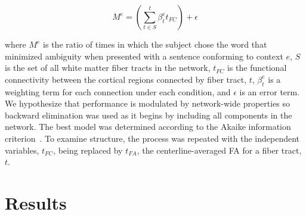 \begin{equation}
M^{e} = \left( \sum^{t}_{t \in S} \beta_{t}^{e} t_{FC} \right) + \epsilon
\end{equation}

where $M^{e}$ is the ratio of times in which the subject chose the word that minimized ambiguity when presented with a sentence conforming to context $e$, $S$ is the set of all white matter fiber tracts in the network, $t_{FC}$ is the functional connectivity between the cortical regions connected by fiber tract, $t$, $\beta_{t}^{e}$ is a weighting term for each connection under each condition, and $\epsilon$ is an error term. We hypothesize that performance is modulated by network-wide properties so backward elimination was used as it begins by including all components in the network. The best model was determined according to the Akaike information criterion~\cite{Akaike1974}. To examine structure, the process was repeated with the independent variables, $t_{FC}$, being replaced by $t_{FA}$, the centerline-averaged FA for a fiber tract, $t$.

\section{Results}

